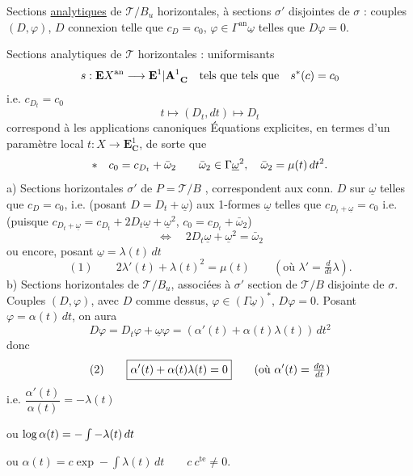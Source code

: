 Sections \uline{analytiques} de $\mathcal T/B_u$ horizontales,  à sections $\sigma'$ disjointes de $\sigma$ : couples  $(D,\varphi)$, $D$ connexion  telle que $c_D=c_0$, $\varphi\in\Gamma^{\mathrm{an}}\underline\omega$ telles que $D\varphi=0$.

Sections analytiques de $\mathcal T$ horizontales  : uniformisants
\[
s:{{\mathbf E}}X^{\mathrm{an}}\longrightarrow{\mathbf E^1|\mathbf A^1}_{\mathbf C}
\quad\text{{tels que} tels que}\quad s^*(c)=c_0
\]
i.e. $c_{D_t}=c_0$
\[
t\longmapsto(D_t,dt)\longmapsto D_t
\]
correspond à les applications canoniques
Équations explicites, en termes d'un paramètre local $t:X\longrightarrow\mathbf E^1_{\mathbf C}$, de sorte que
\[
{{*}}\quad c_0=c_{D_t}+\bar\omega_2\qquad \bar\omega_2\in\Gamma\underline\omega^2,\quad\bar\omega_2=\mu(t)\,dt^2.
\]
a) Sections horizontales $\sigma'$ de $P=\mathcal T/B$ , correspondent aux conn. $D$ sur $\underline\omega$ telles que $c_D=c_0$, i.e. (posant $D=D_t+\underline\omega$) aux 1-formes $\underline\omega$ telles que $c_{D_t+\underline\omega}=c_0$ i.e. (puisque $c_{D_t+\underline\omega}=c_{D_t}+2D_t\underline\omega+\underline\omega^2$, $c_0=c_{D_t}+\bar\omega_2$)
\[
\Longleftrightarrow\quad 2D_t\underline\omega+\underline\omega^2=\bar\omega_2
\]
ou encore, posant $\underline\omega=\lambda(t)\,dt$
\[
(1)\qquad\boxed{2\lambda'(t)+\lambda(t)^2=\mu(t)}\qquad(\text{où }\lambda'=\tfrac d{dt}\lambda).
\]
b) Sections horizontales de $\mathcal T/B_u$, associées à $\sigma'$ section de $\mathcal T/B$ disjointe de $\sigma$. Couples $(D,\varphi)$, avec $D$ comme dessus, $\varphi\in(\Gamma\underline\omega)^*$, $D\varphi=0$. Posant $\varphi=\alpha(t)\,dt$, on aura
\[
D\varphi=D_t\varphi+\underline\omega\varphi=(\alpha'(t)+\alpha(t)\lambda(t))\,dt^2
\]
donc
\[
(2)\qquad\boxed{\alpha'(t)+\alpha(t)\lambda(t)=0}\qquad(\text{où }\alpha'{{(t)}}=\tfrac{d\alpha}{dt})
\]
i.e. $\dfrac{\alpha'(t)}{\alpha(t)}=-\lambda(t)$

ou $\log\alpha(t)=-\int{-}\lambda(t)\,dt$

ou $\alpha(t)=c\exp-\int\lambda(t)\,dt\qquad c\ c^{\mathrm{te}}\ne0$.

